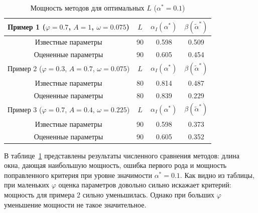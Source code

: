 \documentclass[specialist,
substylefile = spbu_report.rtx,
subf,href,colorlinks=true, 12pt]{disser}
\theoremstyle{definition}
\begin{document}
\begin{table}[h]
	\caption{Мощность методов для оптимальных $L$ ($\alpha^*=0.1$)}
	\label{tab:res_mc-ssa_est}
	\centering
	\begin{tabular}{|cccc|}\hline
		Пример 1 ($\varphi=0.7$, $A=1$, $\omega=0.075$) & $L$ & $\alpha_I(\alpha^*)$ & $\beta(\widetilde\alpha^*)$ \\
		\hline
		Известные параметры & 90 & 0.598 & 0.509 \\
		\hline
		Оцененные параметры & 90 & 0.605 & 0.454 \\
		\hhline{====}
		Пример 2 ($\varphi=0.3$, $A=0.7$, $\omega=0.075$) & $L$ & $\alpha_I(\alpha^*)$ & $\beta(\widetilde\alpha^*)$ \\
		\hline
		Известные параметры & 80 & 0.814 & 0.487 \\
		\hline
		Оцененные параметры & 80 & 0.839 & 0.229 \\
		\hhline{====}
		Пример 3 ($\varphi=0.7$, $A=0.4$, $\omega=0.225$) & $L$ & $\alpha_I(\alpha^*)$ & $\beta(\widetilde\alpha^*)$ \\
		\hline
		Известные параметры & 90 & 0.598 & 0.373 \\
		\hline
		Оцененные параметры & 90 & 0.605 & 0.352\\
		\hline
	\end{tabular}
\end{table}

В таблице~\ref{tab:res_mc-ssa_est} представлены результаты численного сравнения методов: длина окна, дающая наибольшую мощность, ошибка первого рода и мощность поправленного критерия при уровне значимости $\alpha^*=0.1$. Как видно из таблицы, при маленьких $\varphi$ оценка параметров довольно сильно искажает критерий: мощность для примера 2 сильно уменьшилась. Однако при больших $\varphi$ уменьшение мощности не такое значительное.


\end{document}
